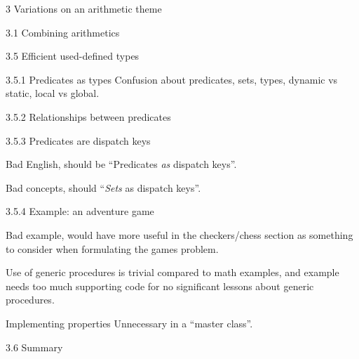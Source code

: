 \documentclass[12pt]{PalisadesLakesBook}
\begin{document}
\begin{plSection}{3 Variations on an arithmetic theme}
\begin{plSection}{3.1 Combining arithmetics}
\begin{plSection}{3.5 Efficient used-defined types}
\begin{plSection}{3.5.1 Predicates as types}
Confusion about predicates, sets, types,
dynamic vs static,
local vs global.

\end{plSection}%
\begin{plSection}{3.5.2 Relationships between predicates}

\end{plSection}%
\begin{plSection}{3.5.3 Predicates are dispatch keys}
 
Bad English, should be ``Predicates \emph{as} dispatch keys''.

Bad concepts, should ``\emph{Sets} as dispatch keys''.
 
\end{plSection}%
\begin{plSection}{3.5.4 Example: an adventure game}
 
Bad example, would have more useful in the checkers/chess
section as something to consider when formulating the 
games problem.

Use of generic procedures is trivial compared
to math examples, and example needs too much supporting code
for no significant lessons about generic procedures.
 
\begin{plSection}{Implementing properties}
Unnecessary in a ``master class''.
\end{plSection}%
\end{plSection}%
\end{plSection}%
\begin{plSection}{3.6 Summary}
\end{plSection}%
\end{plSection}%
\end{plSection}%
\BeginAppendices

\end{document}
